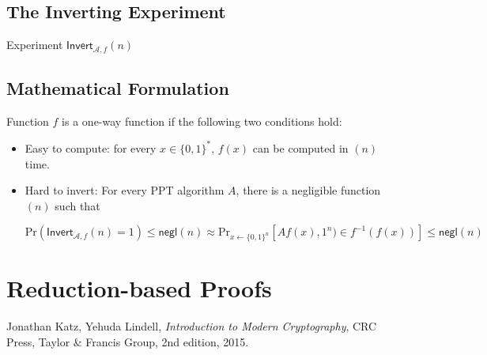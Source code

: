 \documentclass[11pt]{article}
\begin{document}
\subsection{The Inverting Experiment}
Experiment \(\mathsf{Invert}_{\mathcal{A},f} (n)\)


\subsection{Mathematical Formulation}

Function \(f\) is a {\sf one-way function}  if the following two conditions hold:
\begin{itemize}
\item Easy to compute: for every \(x \in \{0, 1\}^*\), \(f(x)\) can be computed in \poly \((n)\) time.
\item Hard to invert: For every PPT algorithm \(A\), there is a negligible function \negl\((n)\) such that

  \[ \mathrm{Pr}(\mathsf{Invert}_{\mathcal{A}, f} (n) = 1) \le \mathsf{negl}(n) \approx \mathrm{Pr} _{x \leftarrow \{ 0, 1\}^n} [A f(x), 1^n) \in f^{-1} (f(x))] \le \mathsf{negl}(n) \]
\end{itemize}
\section{Reduction-based Proofs}


\begin{thebibliography}{9}

  Jonathan Katz, Yehuda Lindell,
  \textit{Introduction to Modern Cryptography},
  CRC Press, Taylor \& Francis Group,
  2nd edition,
  2015.
  
\end{thebibliography}
\end{document}
